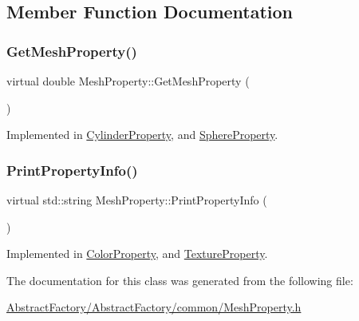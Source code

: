\subsection{Member Function Documentation}
\mbox{\label{class_mesh_property_a0a50701a5c33ce7aec5c413b409a754f}} 
\subsubsection{\texorpdfstring{GetMeshProperty()}{GetMeshProperty()}}
{\footnotesize\ttfamily virtual double Mesh\+Property\+::\+Get\+Mesh\+Property (\begin{DoxyParamCaption}{ }\end{DoxyParamCaption})\hspace{0.3cm}{\ttfamily [pure virtual]}}



Implemented in \mbox{\hyperlink{class_cylinder_property_a9e5b9bf44af9e9284004b1674c2f4837}{Cylinder\+Property}}, and \mbox{\hyperlink{class_sphere_property_a61d802642205f2709812de5585705b10}{Sphere\+Property}}.

\mbox{\label{class_mesh_property_aecb4479e9430b8071104fbf7dde0b1c5}} 
\subsubsection{\texorpdfstring{PrintPropertyInfo()}{PrintPropertyInfo()}}
{\footnotesize\ttfamily virtual std\+::string Mesh\+Property\+::\+Print\+Property\+Info (\begin{DoxyParamCaption}{ }\end{DoxyParamCaption})\hspace{0.3cm}{\ttfamily [pure virtual]}}



Implemented in \mbox{\hyperlink{class_color_property_a1a04f62489d3f17f2984fdafa7db3f52}{Color\+Property}}, and \mbox{\hyperlink{class_texture_property_a701b7bb567726578a322b078d35b8711}{Texture\+Property}}.



The documentation for this class was generated from the following file\+:\begin{DoxyCompactItemize}
\item 
\mbox{\hyperlink{_abstract_factory_2_abstract_factory_2common_2_mesh_property_8h}{Abstract\+Factory/\+Abstract\+Factory/common/\+Mesh\+Property.\+h}}\end{DoxyCompactItemize}
